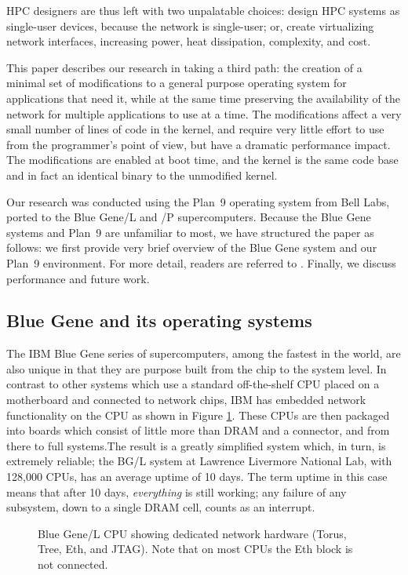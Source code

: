 \documentclass[letterpaper,twocolumn,10pt]{article}
\begin{document}
HPC designers are thus left with two unpalatable choices: design HPC systems as single-user devices, because the network is single-user; or, create virtualizing network interfaces, increasing power, heat dissipation, complexity, and cost. 

This paper describes our research in taking a third path: the creation of  a minimal set of modifications to a general purpose operating system for applications that need it, while at the same time preserving the availability of the network for multiple applications to use at a time. The modifications affect a very small number of lines of code in the kernel, and require very little 
effort to use from the programmer's point of view, but have a dramatic 
performance impact. The modifications are enabled at boot time, and the kernel is the same code base and in fact an identical binary to the unmodified kernel. 

Our research was conducted using the Plan~9 operating system from Bell Labs, ported to the Blue Gene/L and /P supercomputers. Because the Blue Gene systems and Plan~9 are unfamiliar to most, we have structured the paper as follows: we first provide very brief overview of the Blue Gene system and our Plan~9 environment. For more detail, readers are referred to \cite{plan9bgp}. 
Finally, we discuss performance and future work. 

\subsection{Blue Gene and its operating systems}
The IBM Blue Gene\cite{DBLP:journals/ibmrd/GaraBCCCGHHHKLOSTV05} series of supercomputers, among the fastest in the world, are also unique in that they are purpose built from the chip to the system level. In contrast to other systems which use a standard off-the-shelf CPU placed on a motherboard and connected to network chips, IBM has embedded network functionality on the CPU as shown in Figure \ref{bglchip}. These CPUs are then packaged into boards which consist of little more than DRAM and a connector, and from there to full systems.The result is a greatly simplified system which, in turn, is extremely reliable; the BG/L system at Lawrence Livermore National Lab, with 128,000 CPUs, has an average uptime of 10 days. The term uptime in this case means that after 10 days, {\em everything} is still working; any failure of any subsystem, down to a single DRAM cell, counts as an interrupt.
\begin{figure}
\caption{\label{bglchip}Blue Gene/L CPU showing dedicated network hardware (Torus, Tree, Eth, and JTAG). Note that on most CPUs the Eth block is not connected.}
\end{figure}
\end{document}
